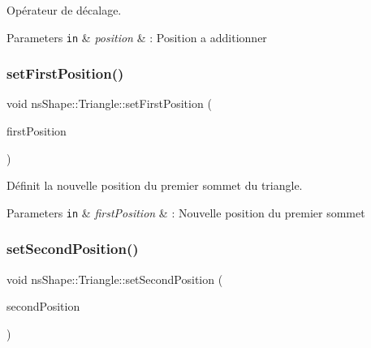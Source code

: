 Opérateur de décalage. 


\begin{DoxyParams}[1]{Parameters}
\mbox{\tt in}  & {\em position} & \+: Position a additionner \\
\hline
\end{DoxyParams}
\mbox{\label{classns_shape_1_1_triangle_a9cbdb05c4f337961adccadf1aec48b1b}} 
\subsubsection{\texorpdfstring{set\+First\+Position()}{setFirstPosition()}}
{\footnotesize\ttfamily void ns\+Shape\+::\+Triangle\+::set\+First\+Position (\begin{DoxyParamCaption}\item[{const \hyperlink{classns_graphics_1_1_vec2_d}{ns\+Graphics\+::\+Vec2D} \&}]{first\+Position }\end{DoxyParamCaption})}



Définit la nouvelle position du premier sommet du triangle. 


\begin{DoxyParams}[1]{Parameters}
\mbox{\tt in}  & {\em first\+Position} & \+: Nouvelle position du premier sommet \\
\hline
\end{DoxyParams}
\mbox{\label{classns_shape_1_1_triangle_a18f911ec00c99e29eec695a49c2e051e}} 
\subsubsection{\texorpdfstring{set\+Second\+Position()}{setSecondPosition()}}
{\footnotesize\ttfamily void ns\+Shape\+::\+Triangle\+::set\+Second\+Position (\begin{DoxyParamCaption}\item[{const \hyperlink{classns_graphics_1_1_vec2_d}{ns\+Graphics\+::\+Vec2D} \&}]{second\+Position }\end{DoxyParamCaption})}



